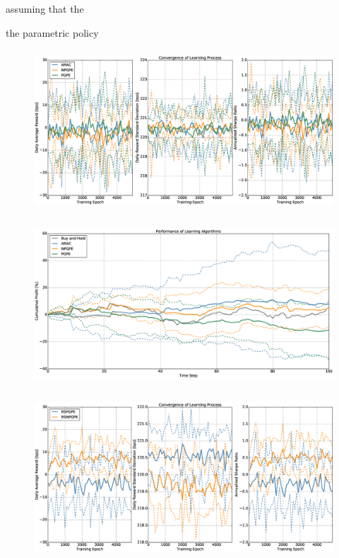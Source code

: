 assuming that the 

the parametric policy 

\begin{figure}[t!]
	\centering
	\includegraphics[height=6cm,width=1.0\textwidth]{Images/8_8_single_hist_neutral_convergence}
	\caption[]{}
	\label{fig:}
\end{figure}

\begin{figure}[t!]
	\centering
	\includegraphics[height=6cm,width=1.0\textwidth]{Images/8_9_single_hist_neutral_performance}
	\caption[]{}
	\label{fig:}
\end{figure}

\begin{figure}[t!]
	\centering
	\includegraphics[height=6cm,width=1.0\textwidth]{Images/8_10_single_hist_sensitive_convergence}
	\caption[]{}
	\label{fig:}
\end{figure}

